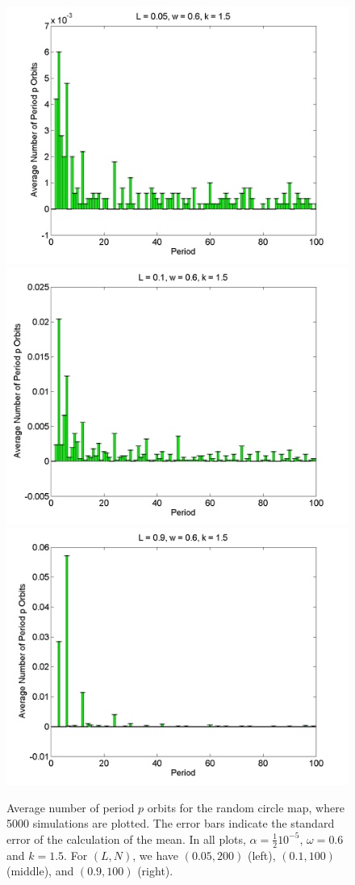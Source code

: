 \begin{figure}[H]\linespread{1}
\caption[Average number of period $p$ orbits for the random circle
map (uniform distribution), for $\alpha=\frac{1}{2}10^{-5}$, $\omega=0.6$ and $k=1.5$]{Average number of period $p$ orbits for the random circle
map, where 5000 simulations are plotted. The error bars indicate
the standard error of the calculation of the mean. In all plots,
$\alpha = \frac{1}{2}10^{-5}$, $\omega=0.6$ and $k=1.5$. For $(L,N)$,
we have $(0.05, 200)$ (left), $(0.1, 100)$
(middle), and $(0.9, 100)$ (right).}\label{fig:rcirchist_u_ha2}
	\begin{center}	\includegraphics[width=.33\textwidth]{figs/rcirc_hist_u_halfa_L_005_w_06_k_15_sims_5000.png}\hfill
\includegraphics[width=.33\textwidth]{figs/rcirc_hist_u_halfa_L_01_w_06_k_15_sims_5000.png}\hfill
\includegraphics[width=.33\textwidth]{figs/rcirc_hist_u_halfa_L_09_w_06_k_15_sims_5000.png}
	\end{center}
\end{figure}

